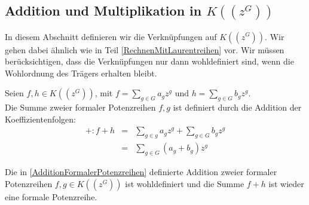 \subsection{Addition und Multiplikation in $K((z^{G}))$}
%
%
%
%
%
%
In diesem Abschnitt definieren wir die Verknüpfungen auf $K((z^{G}))$. Wir gehen dabei ähnlich wie in Teil \ref{RechnenMitLaurentreihen} vor. Wir müssen berücksichtigen, dass die Verknüpfungen nur dann wohldefiniert sind, wenn die Wohlordnung des Trägers erhalten bleibt.
%
%
%
%
%
%
%
%
%
\begin{defn}\label{AdditionFormalerPotenzreihen}
Seien $f, h \in K\left(\left(z^G\right)\right)$, mit $f = \sum_{g \in G}^{} a_g z^g \text{ und } h = \sum_{g \in G}^{} b_g z^g$.\\
Die Summe zweier formaler Potenzreihen $f, g$ ist definiert durch die Addition der Koeffizientenfolgen:
%
\begin{eqnarray*}
+ \colon f + h &=& \sum_{g \in g}^{} a_g z^g + \sum_{g \in G}^{} b_g z^g \\
&=& \sum_{g \in G}^{}\left(a_g + b_g\right)z^g 
\end{eqnarray*}
%

\end{defn}
%
%
%
%
%
\begin{satz}\label{wohldefiniertheitAddition}
Die in \ref{AdditionFormalerPotenzreihen} definierte Addition zweier formaler Potenzreihen $f, g \in K\left(\left(z^{G}\right)\right)$ ist wohldefiniert und die Summe $f +h$ ist wieder eine formale Potenzreihe.
\end{satz}
